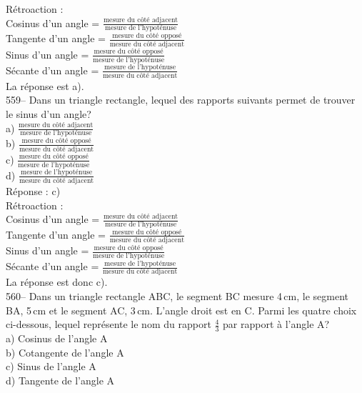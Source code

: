 ﻿\documentclass[letterpaper, 12pt]{article}
\begin{document}
R\'etroaction : \\
Cosinus d'un angle = $\frac{\textrm{mesure du c\^ot\'e
adjacent}}{\textrm{mesure de l'hypot\'enuse}}$\\[2mm]
Tangente d'un angle = $\frac{\textrm{mesure du c\^ot\'e
oppos\'e}}{\textrm{mesure du c\^ot\'e adjacent}}$\\[2mm]
Sinus d'un angle = $\frac{\textrm{mesure du c\^ot\'e
oppos\'e}}{\textrm{mesure de l'hypot\'enuse}}$\\[2mm]
S\'ecante d'un angle =  $\frac{\textrm{mesure de
l'hypot\'enuse}}{\textrm{mesure du c\^ot\'e adjacent}}$\\[2mm]
La r\'eponse est a).\\

559-- Dans un triangle rectangle, lequel des rapports suivants permet de
trouver le sinus d'un angle?\\[2mm]
a) $\frac{\textrm{mesure du c\^ot\'e adjacent}}{\textrm{mesure de
l'hypot\'enuse}}$\\[2mm]
b) $\frac{\textrm{mesure du c\^ot\'e oppos\'e}}{\textrm{mesure du c\^ot\'e
adjacent}}$\\[2mm]
c) $\frac{\textrm{mesure du c\^ot\'e oppos\'e}}{\textrm{mesure de
l'hypot\'enuse}}$\\[2mm]
d) $\frac{\textrm{mesure de l'hypot\'enuse}}{\textrm{mesure du c\^ot\'e
adjacent}}$\\

R\'eponse : c)\\

R\'etroaction : \\
Cosinus d'un angle = $\frac{\textrm{mesure du c\^ot\'e
adjacent}}{\textrm{mesure de l'hypot\'enuse}}$\\[2mm]
Tangente d'un angle = $\frac{\textrm{mesure du c\^ot\'e
oppos\'e}}{\textrm{mesure du c\^ot\'e adjacent}}$\\[2mm]
Sinus d'un angle = $\frac{\textrm{mesure du c\^ot\'e
oppos\'e}}{\textrm{mesure de l'hypot\'enuse}}$\\[2mm]
S\'ecante d'un angle =  $\frac{\textrm{mesure de
l'hypot\'enuse}}{\textrm{mesure du c\^ot\'e adjacent}}$\\[2mm]
La r\'eponse est donc c).\\

560-- Dans un triangle rectangle ABC, le segment BC mesure 4\,cm, le segment
BA, 5\,cm et le segment AC, 3\,cm.  L'angle droit est en C.  Parmi les
quatre choix ci-dessous, lequel repr\'esente le nom du rapport $\frac{4}{3}$
par rapport \`a l'angle A?\\
a) Cosinus de l'angle A\\
b) Cotangente de l'angle A\\
c) Sinus de l'angle A\\
d) Tangente de l'angle A\\
\end{document}
